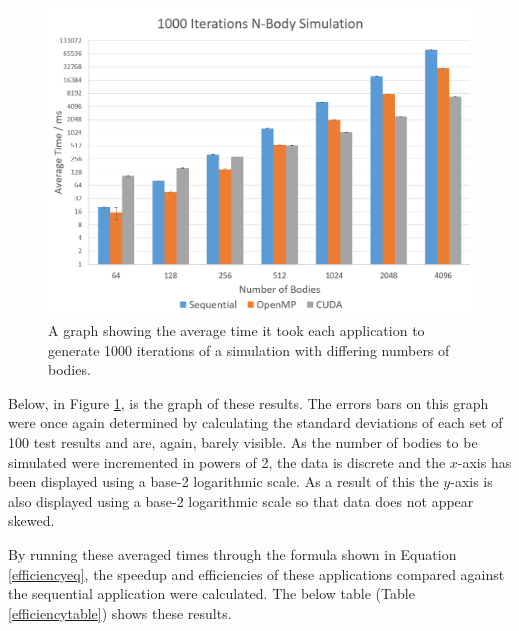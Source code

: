 \documentclass[12pt,journal,transmag]{IEEEtran}
\begin{document}
	\begin{figure}[!h]
		\centering
		\includegraphics[width=1.5\columnwidth]{IMAGES/perfcomp1}
		\caption{A graph showing the average time it took each application to generate 1000 iterations of a simulation with differing numbers of bodies.}
		\label{graph2}
	\end{figure}
	
	Below, in Figure \ref{graph2}, is the graph of these results. The errors bars on this graph were once again determined by calculating the standard deviations of each set of 100 test results and are, again, barely visible. As the number of bodies to be simulated were incremented in powers of 2, the data is discrete and the $x$-axis has been displayed using a base-2 logarithmic scale. As a result of this the $y$-axis is also displayed using a base-2 logarithmic scale so that data does not appear skewed.
	
	By running these averaged times through the formula shown in Equation \ref{efficiencyeq}, the speedup and efficiencies of these applications compared against the sequential application were calculated. The below table (Table \ref{efficiencytable}) shows these results.
\end{document}
